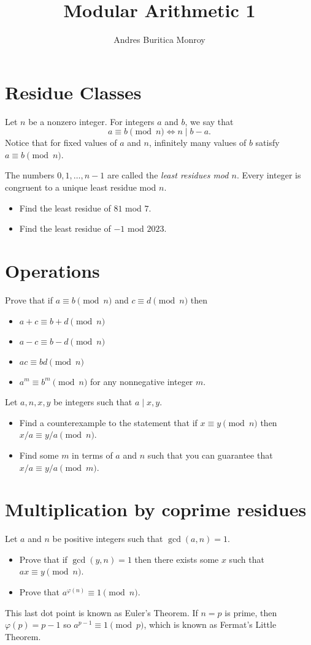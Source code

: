\documentclass{article}
\title{Modular Arithmetic 1}
\author{Andres Buritica Monroy}
\date{}
\begin{document}
\maketitle
\section{Residue Classes}
  Let $n$ be a nonzero integer. For integers $a$ and $b$, we say that
  \[a\equiv b\pmod n\iff n\mid b-a.\]
  Notice that for fixed values of $a$ and $n$, infinitely many values of $b$
  satisfy $a\equiv b\pmod n$.

  The numbers $0,1,\ldots,n-1$ are called the \emph{least residues mod $n$}. 
  Every integer is congruent to a unique least residue mod $n$.
  \begin{itemize}
    \item Find the least residue of $81$ mod $7$.
    \item Find the least residue of $-1$ mod $2023$.
  \end{itemize}
\section{Operations}
  Prove that if $a\equiv b\pmod n$ and $c\equiv d\pmod n$ then
  \begin{itemize}
    \item $a+c\equiv b+d\pmod n$
    \item $a-c\equiv b-d\pmod n$
    \item $ac\equiv bd\pmod n$
    \item $a^m\equiv b^m\pmod n$ for any nonnegative integer $m$.
  \end{itemize}
  Let $a,n,x,y$ be integers such that $a\mid x,y$.
  \begin{itemize}
    \item Find a counterexample to the statement that if $x\equiv y\pmod n$ then $x/a\equiv
      y/a\pmod n$.
    \item Find some $m$ in terms of $a$ and $n$ such that you can guarantee that
      $x/a\equiv y/a\pmod m$.
  \end{itemize}
\section{Multiplication by coprime residues}
  Let $a$ and $n$ be positive integers such that $\gcd(a,n)=1$.
  \begin{itemize}
    \item Prove that if $\gcd(y,n)=1$ then there exists some $x$ such that
      $ax\equiv y\pmod n$.
    \item Prove that $a^{\varphi(n)}\equiv 1\pmod n$. 
  \end{itemize}
  This last dot point is known as Euler's
    Theorem. If $n=p$ is prime, then $\varphi(p)=p-1$ so $a^{p-1}\equiv 1\pmod
    p$, which is known as Fermat's Little Theorem.
\end{document}
